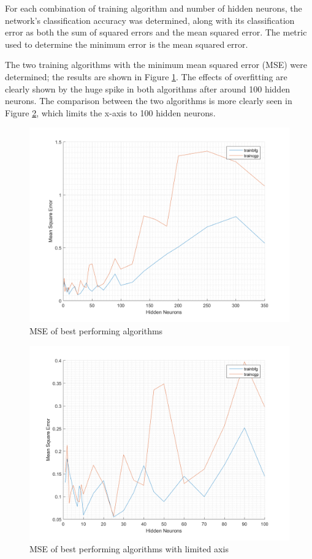 \documentclass[a4paper, 10pt, conference]{ieeeconf}
\begin{document}
For each combination of training algorithm and number of hidden neurons, the network's classification accuracy was determined, along with its classification error as both the sum of squared errors and the mean squared error. The metric used to determine the minimum error is the mean squared error.

The two training algorithms with the minimum mean squared error (MSE) were determined; the results are shown in Figure \ref{fig:unmixed_full}. The effects of overfitting are clearly shown by the huge spike in both algorithms after around 100 hidden neurons. The comparison between the two algorithms is more clearly seen in Figure \ref{fig:unmixed_limited}, which limits the x-axis to 100 hidden neurons.

\begin{figure}[!ht]
    \centering
    \includegraphics[width=\linewidth]{pic/unmixed_best_fullrange.png}
    \caption{MSE of best performing algorithms}
    \label{fig:unmixed_full}
\end{figure}

\begin{figure}[!ht]
    \centering
    \includegraphics[width=\linewidth]{pic/unmixed_best_limited.png}
    \caption{MSE of best performing algorithms with limited axis}
    \label{fig:unmixed_limited}
\end{figure}
\end{document}
